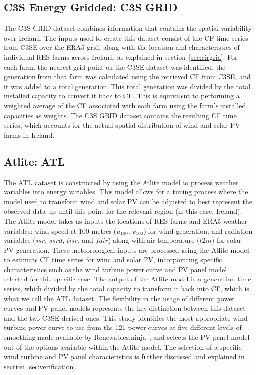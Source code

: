 \documentclass[preprint, 12pt]{elsarticle}
\begin{document}
\subsection{C3S Energy Gridded: C3S GRID}
\label{sec:c3se_g}

The C3S GRID dataset combines information that contains the spatial variability over Ireland. The inputs used to create this dataset consist of the CF time series from C3SE over the ERA5 grid, along with the location and characteristics of individual RES farms across Ireland, as explained in section~\ref{sec:eirgrid}. For each farm, the nearest grid point on the C3SE dataset was identified, the generation from that farm was calculated using the retrieved CF from C3SE, and it was added to a total generation. This total generation was divided by the total installed capacity to convert it back to CF. This is equivalent to performing a weighted average of the CF associated with each farm using the farm's installed capacities as weights. The C3S GRID dataset contains the resulting CF time series, which accounts for the actual spatial distribution of wind and solar PV farms in Ireland.

\subsection{Atlite: ATL} 
\label{sec:atlite}

The ATL dataset is constructed by using the Atlite model to process weather variables into energy variables. This model allows for a tuning process where the model used to transform wind and solar PV can be adjusted to best represent the observed data up until this point for the relevant region (in this case, Ireland). The Atlite model takes as inputs the locations of RES farms and ERA5 weather variables: wind speed at 100 metres ($u_{100}$, $v_{100}$) for wind generation, and radiation variables ($ssr$, $ssrd$, $tisr$, and $fdir$) along with air temperature ($t2m$) for solar PV generation. These meteorological inputs are processed using the Atlite model to estimate CF time series for wind and solar PV, incorporating specific characteristics such as the wind turbine power curve and PV panel model selected for this specific case. The output of the Atlite model is a generation time series, which divided by the total capacity to transform it back into CF, which is what we call the ATL dataset. The flexibility in the usage of different power curves and PV panel models represents the key distinction between this dataset and the two C3SE-derived ones. This study identifies the most appropriate wind turbine power curve to use from the 121 power curves at five different levels of smoothing made available by Renewables.ninja~\citep{staffell2016wake}, and selects the PV panel model out of the options available within the Atlite model. The selection of a specific wind turbine and PV panel characteristics is further discussed and explained in section \ref{sec:verification}.
\end{document}
